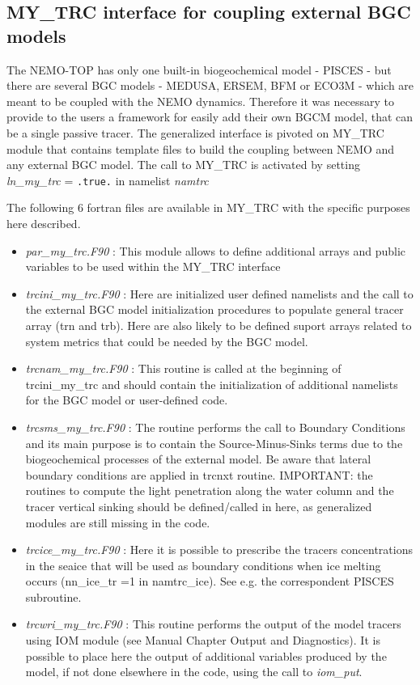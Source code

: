 \documentclass[../main/TOP_manual]{subfiles}
\begin{document}
\subsection{MY\_TRC interface for coupling external BGC models}
\label{Mytrc}

The NEMO-TOP has only one built-in biogeochemical model - PISCES - but there are several BGC models - MEDUSA, ERSEM, BFM or ECO3M - which are meant to be coupled with the NEMO dynamics. Therefore it was necessary to provide to the users a framework for easily add their own BGCM model, that can be a single passive tracer.
The generalized interface is pivoted on MY\_TRC module that contains template files to build the coupling between NEMO and any external BGC model. The call to MY\_TRC is activated by setting  \textit{ln\_my\_trc} = \texttt{.true.} in namelist \textit{namtrc}

The following 6 fortran files are available in MY\_TRC with the specific purposes here described.

\begin{itemize}
   \item \textit{par\_my\_trc.F90} :  This module allows to define additional arrays and public variables to be used within the MY\_TRC interface
   \item \textit{trcini\_my\_trc.F90} :  Here are initialized user defined namelists and the call to the external BGC model initialization procedures to populate general tracer array (trn and trb). Here are also likely to be defined suport arrays related to system metrics that could be needed by the BGC model.
  \item \textit{trcnam\_my\_trc.F90} :  This routine is called at the beginning of trcini\_my\_trc and should contain the initialization of additional namelists for the BGC model or user-defined code.
  \item \textit{trcsms\_my\_trc.F90} :  The routine performs the call to Boundary Conditions and its main purpose is to contain the Source-Minus-Sinks terms due to the biogeochemical processes of the external model. Be aware that lateral boundary conditions are applied in trcnxt routine. IMPORTANT: the routines to compute the light penetration along the water column and the tracer vertical sinking should be defined/called in here, as generalized modules are still missing in the code.
 \item \textit{trcice\_my\_trc.F90} : Here it is possible to prescribe the tracers concentrations in the seaice that will be used as boundary conditions when ice melting occurs (nn\_ice\_tr =1 in namtrc\_ice). See e.g. the correspondent PISCES subroutine.
 \item \textit{trcwri\_my\_trc.F90} : This routine performs the output of the model tracers using IOM module (see Manual Chapter Output and Diagnostics). It is possible to place here the output of additional variables produced by the model, if not done elsewhere in the code, using the call to \textit{iom\_put}.
\end{itemize}
\end{document}
